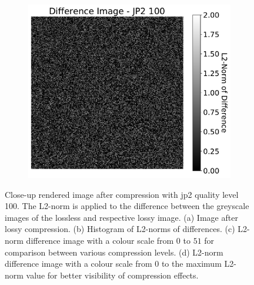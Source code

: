 \begin{figure}[htb]
\begin{subfigure}[b]{0.48\textwidth}
        \caption{}
        \label{fig:img_quality_comp_jp2_100_center_diff}
    \end{subfigure}
    \begin{subfigure}[b]{0.48\textwidth}
        \centering
        \includegraphics[width=\textwidth]{doc/thesis/0_figures/compare_quality/set1/jp2_100_center_diff_heatmap_rel}
        \caption{}
        \label{fig:img_quality_comp_jp2_100_center_diff_rel}
    \end{subfigure}
    \caption{Close-up rendered image after compression with \gls{jp2} quality level 100. The L2-norm is applied to the difference between the greyscale images of the lossless and respective lossy image. (a) Image after lossy compression. (b) Histogram of L2-norms of differences. (c) L2-norm difference image with a colour scale from $0$ to $51$ for comparison between various compression levels. (d) L2-norm difference image with a colour scale from $0$ to the maximum L2-norm value for better visibility of compression effects.}
    \label{fig:img_quality_comp_jp2_100_center}
\end{figure}

